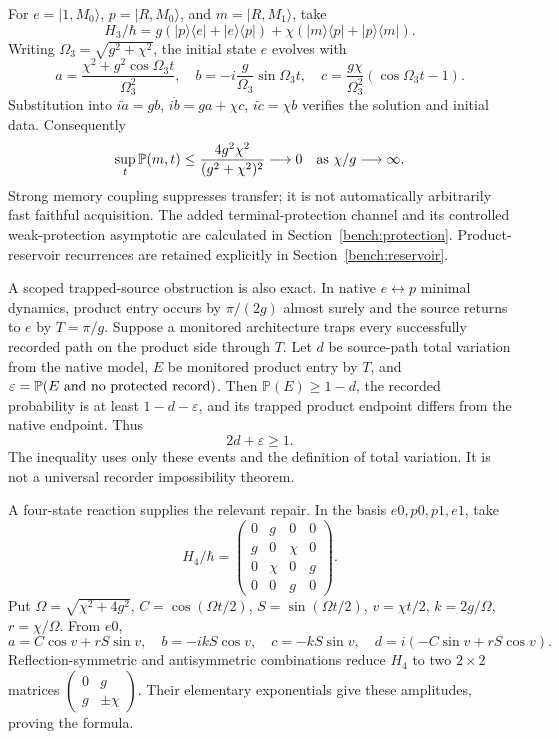 \documentclass[11pt,oneside,openany]{book}
\theoremstyle{definition}
\theoremstyle{remark}\newtheorem{remark}[theorem]{Remark}
\begin{document}
For $e=|1,M_0\rangle$, $p=|R,M_0\rangle$, and
$m=|R,M_1\rangle$, take
\[
 H_3/\hbar=g(|p\rangle\langle e|+|e\rangle\langle p|)
          +\chi(|m\rangle\langle p|+|p\rangle\langle m|).
\]
Writing $\Omega_3=\sqrt{g^2+\chi^2}$, the initial state $e$ evolves with
\[
 a=\frac{\chi^2+g^2\cos\Omega_3t}{\Omega_3^2},\quad
 b=-i\frac g{\Omega_3}\sin\Omega_3t,\quad
 c=\frac{g\chi}{\Omega_3^2}(\cos\Omega_3t-1).
\]
Substitution into $i\dot a=gb$, $i\dot b=ga+\chi c$,
$i\dot c=\chi b$ verifies the solution and initial data. Consequently
\begin{equation}
 \sup_t\mathbb P(m,t)\le
       \frac{4g^2\chi^2}{(g^2+\chi^2)^2}\longrightarrow0
       \quad\hbox{as }\chi/g\longrightarrow\infty.
 \label{cfg:threebound}
\end{equation}
Strong memory coupling suppresses transfer; it is not automatically
arbitrarily fast faithful acquisition. The added terminal-protection
channel and its controlled weak-protection asymptotic are calculated in
Section~\ref{bench:protection}. Product-reservoir recurrences are retained
explicitly in Section~\ref{bench:reservoir}.

A scoped trapped-source obstruction is also exact. In native
$e\leftrightarrow p$ minimal dynamics, product entry occurs by $\pi/(2g)$
almost surely and the source returns to $e$ by $T=\pi/g$.
Suppose a monitored architecture traps every successfully recorded path
on the product side through $T$. Let $d$ be source-path total variation
from the native model, $E$ be monitored product entry by $T$, and
$\varepsilon=\mathbb P(E\hbox{ and no protected record})$. Then
$\mathbb P(E)\ge1-d$, the recorded probability is at least
$1-d-\varepsilon$, and its trapped product endpoint differs from the
native endpoint. Thus
\begin{equation}
 2d+\varepsilon\ge1.
 \label{cfg:trap}
\end{equation}
The inequality uses only these events and the definition of total variation.
It is not a universal recorder impossibility theorem.

A four-state reaction supplies the relevant repair. In the basis
$e0,p0,p1,e1$, take
\[
 H_4/\hbar=
 \begin{pmatrix}
 0&g&0&0\\g&0&\chi&0\\0&\chi&0&g\\0&0&g&0
 \end{pmatrix}.
\]
Put $\Omega=\sqrt{\chi^2+4g^2}$,
$C=\cos(\Omega t/2)$, $S=\sin(\Omega t/2)$,
$v=\chi t/2$, $k=2g/\Omega$, $r=\chi/\Omega$. From $e0$,
\[
 a=C\cos v+rS\sin v,\quad b=-ikS\cos v,\quad
 c=-kS\sin v,\quad d=i(-C\sin v+rS\cos v).
\]
Reflection-symmetric and antisymmetric combinations reduce $H_4$ to two
$2\times2$ matrices $\left(\begin{smallmatrix}0&g\\g&\pm\chi\end{smallmatrix}\right)$.
Their elementary exponentials give these amplitudes, proving the formula.
\end{document}
